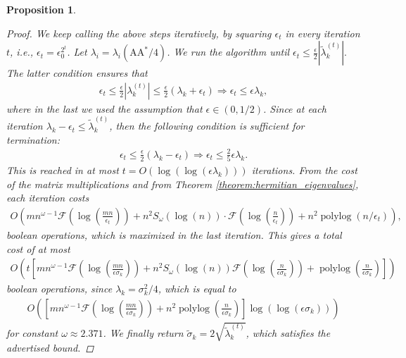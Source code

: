\documentclass{article}
\newcommand{\lbrac}{\left[}
\newcommand{\rbrac}{\right]}
\newcommand{\lpar}{\left(}
\newcommand{\rpar}{\right)}
\newtheorem{proposition}{Proposition}[section]
\DeclareMathOperator{\polylog}{polylog}
\newcommand\matA{\boldsymbol{\mathrm{A}}}
\newcommand{\flopcost}{\mathcal{F}}
\begin{document}
\begin{proposition}
\begin{proof}
    We keep calling the above steps iteratively, by squaring $\epsilon_t$ in every iteration $t$, i.e., $\epsilon_t=\epsilon_0^{2^t}$. Let $\lambda_i=\lambda_i(\matA\matA^*/4)$.
    We run the algorithm until $\epsilon_t \leq \frac{\epsilon}{2}|\widetilde\lambda_k^{(t)}|.$ The latter condition ensures that
    \begin{align*}
        \epsilon_t 
        \leq
        \frac{\epsilon}{2} |\lambda_k^{(t)}|
        \leq
        \frac{\epsilon}{2}\lpar
            \lambda_k
            +
            \epsilon_t
        \rpar
        \Rightarrow
        \epsilon_t\leq \epsilon\lambda_k,
    \end{align*}
    where in the last we used the assumption that $\epsilon\in(0,1/2)$.
    Since at each iteration $\lambda_k-\epsilon_t\leq \widetilde\lambda_k^{(t)}$, then the following condition is sufficient for termination:
    \begin{align*}
        \epsilon_t \leq \frac{\epsilon}{2}
        (\lambda_k-\epsilon_t) 
        \Rightarrow 
        \epsilon_t \leq \frac{2}{5}\epsilon\lambda_k.
    \end{align*}
    This is reached in at most $t=O(\log(\log(\epsilon\lambda_k)))$ iterations. From the cost of the matrix multiplications and from Theorem \ref{theorem:hermitian_eigenvalues}, each iteration costs
    \begin{align*}
        O\lpar mn^{\omega-1}\flopcost(\log(\tfrac{mn}{\epsilon_t}))
        +
        n^2S_{\omega}
            (\log(n))
            \cdot
            \flopcost(\log(\tfrac{n}{\epsilon_t}))
            +
            n^2\polylog(n/\epsilon_t)
        \rpar,
    \end{align*}
    boolean operations,
    which is maximized in the last iteration. This gives a total cost of at most
    \begin{align*}O
        \lpar 
            t
            \lbrac
            mn^{\omega-1}\flopcost(\log(\tfrac{mn}{\epsilon\sigma_k}))
            +
            n^2
                S_{\omega}(\log(n))
                \flopcost(\log(\tfrac{n}{\epsilon\sigma_k}))
                +
                \polylog(\tfrac{n}{\epsilon\sigma_k})
            \rbrac
        \rpar
    \end{align*}
    boolean operations, since $\lambda_k=\sigma_k^2/4$, which is equal to
    \begin{align*}
        O\lpar
            \lbrac
                mn^{\omega-1}\flopcost(\log(\tfrac{mn}{\epsilon\sigma_k}))
                +
                n^2\polylog(\tfrac{n}{\epsilon\sigma_k})
            \rbrac
            \log(\log(\epsilon\sigma_k))
        \rpar
    \end{align*}
    for constant $\omega\approx 2.371$.
    We finally return $\widetilde\sigma_k = 2\sqrt{\widetilde\lambda_{k}^{(t)}}$, which satisfies the advertised bound.
    \end{proof}
\end{proposition}
\end{document}
